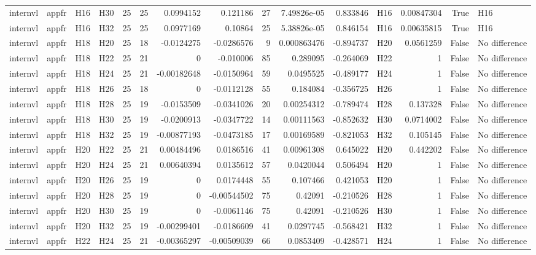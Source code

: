 \begin{longtable}{llllrrrrrrrlrrl}
internvl & appfr & H16 & H30 & 25 & 25 & 0.0994152 & 0.121186 & 27 & 7.49826e-05 & 0.833846 & H16 & 0.00847304 & True & H16 \\
internvl & appfr & H16 & H32 & 25 & 25 & 0.0977169 & 0.10864 & 25 & 5.38826e-05 & 0.846154 & H16 & 0.00635815 & True & H16 \\
internvl & appfr & H18 & H20 & 25 & 18 & -0.0124275 & -0.0286576 & 9 & 0.000863476 & -0.894737 & H20 & 0.0561259 & False & No difference \\
internvl & appfr & H18 & H22 & 25 & 21 & 0 & -0.010006 & 85 & 0.289095 & -0.264069 & H22 & 1 & False & No difference \\
internvl & appfr & H18 & H24 & 25 & 21 & -0.00182648 & -0.0150964 & 59 & 0.0495525 & -0.489177 & H24 & 1 & False & No difference \\
internvl & appfr & H18 & H26 & 25 & 18 & 0 & -0.0112128 & 55 & 0.184084 & -0.356725 & H26 & 1 & False & No difference \\
internvl & appfr & H18 & H28 & 25 & 19 & -0.0153509 & -0.0341026 & 20 & 0.00254312 & -0.789474 & H28 & 0.137328 & False & No difference \\
internvl & appfr & H18 & H30 & 25 & 19 & -0.0200913 & -0.0347722 & 14 & 0.00111563 & -0.852632 & H30 & 0.0714002 & False & No difference \\
internvl & appfr & H18 & H32 & 25 & 19 & -0.00877193 & -0.0473185 & 17 & 0.00169589 & -0.821053 & H32 & 0.105145 & False & No difference \\
internvl & appfr & H20 & H22 & 25 & 21 & 0.00484496 & 0.0186516 & 41 & 0.00961308 & 0.645022 & H20 & 0.442202 & False & No difference \\
internvl & appfr & H20 & H24 & 25 & 21 & 0.00640394 & 0.0135612 & 57 & 0.0420044 & 0.506494 & H20 & 1 & False & No difference \\
internvl & appfr & H20 & H26 & 25 & 19 & 0 & 0.0174448 & 55 & 0.107466 & 0.421053 & H20 & 1 & False & No difference \\
internvl & appfr & H20 & H28 & 25 & 19 & 0 & -0.00544502 & 75 & 0.42091 & -0.210526 & H28 & 1 & False & No difference \\
internvl & appfr & H20 & H30 & 25 & 19 & 0 & -0.0061146 & 75 & 0.42091 & -0.210526 & H30 & 1 & False & No difference \\
internvl & appfr & H20 & H32 & 25 & 19 & -0.00299401 & -0.0186609 & 41 & 0.0297745 & -0.568421 & H32 & 1 & False & No difference \\
internvl & appfr & H22 & H24 & 25 & 21 & -0.00365297 & -0.00509039 & 66 & 0.0853409 & -0.428571 & H24 & 1 & False & No difference \\

\end{longtable}
